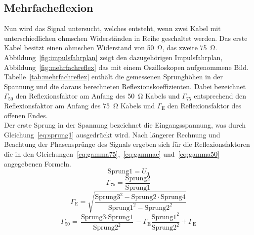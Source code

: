 \subsection{Mehrfacheflexion}
%
Nun wird das Signal untersucht, welches entsteht, wenn zwei Kabel mit
unterschiedlichen ohmschen Widerständen in Reihe geschaltet werden. Das
erste Kabel besitzt einen ohmschen Widerstand von \SI{50}{\ohm}, das
zweite \SI{75}{\ohm}.  Abbildung~\ref{fig:impulsfahrplan} zeigt den
dazugehörigen Impulsfahrplan, Abbildung~\ref{fig:mehrfachreflex} das mit
einem Oszilloskopen aufgenommene Bild.  Tabelle~\ref{tab:mehrfachreflex}
enthält die gemessenen Sprunghöhen in der Spannung und die daraus
berechneten Reflexionskoeffizienten.  Dabei bezeichnet $\Gamma_{50}$ den
Reflexionsfaktor am Anfang des \SI{50}{\ohm} Kabels und $\Gamma_{75}$
entsprechend den Reflexionsfaktor am Anfang des \SI{75}{\ohm} Kabels 
und $\Gamma_\text{E}$ den Reflexionsfaktor des offenen Endes.\\
Der erste Sprung in der Spannung bezeichnet die Eingangsspannung, 
was durch Gleichung~\eqref{eq:sprung1} ausgedrückt wird.
Nach längerer Rechnung und Beachtung der Phasensprünge des Signals 
ergeben sich für die Reflexionsfaktoren die in den 
Gleichungen~\eqref{eq:gamma75},~\eqref{eq:gammae} 
und~\eqref{eq:gamma50} angegebenen Formeln.\\
%
\begin{equation}
  \text{Sprung1} = U_0
  \label{eq:sprung1}
\end{equation}
%
\begin{equation}
  \Gamma_{75} = \frac{\text{Sprung2}}{\text{Sprung1}}
  \label{eq:gamma75}
\end{equation}
%
\begin{equation}
 \Gamma_\text{E} = \sqrt{\frac{\text{Sprung3}^2 -\text{Sprung2}\cdot \text{Sprung4}}
{\text{Sprung1}^2 -\text{Sprung2}^2}}
  \label{eq:gammae}
\end{equation}
%
\begin{equation}
\Gamma_{50} = \frac{\text{Sprung3}\cdot \text{Sprung1}}
{\text{Sprung2}^2}
-\Gamma_\text{E}\frac{\text{Sprung1}^2}{\text{Sprung2}^2}
+\Gamma_\text{E}
\label{eq:gamma50}
\end{equation}
%
